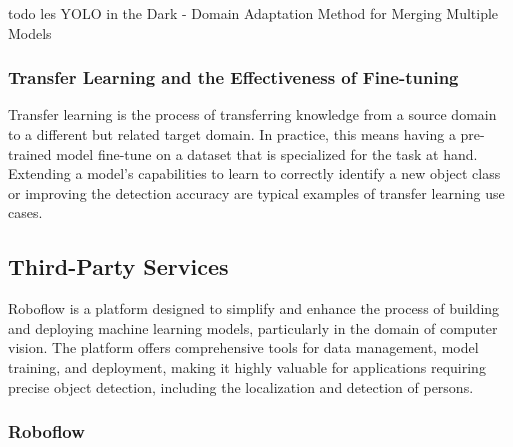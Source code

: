 todo les YOLO in the Dark - Domain Adaptation Method for Merging Multiple Models

\subsubsection{Transfer Learning and the Effectiveness of Fine-tuning}
\label{sec:dataset_specialization}
Transfer learning is the process of transferring knowledge from a source domain to a different but related target domain. In practice, this means having a pre-trained model fine-tune on a dataset that is specialized for the task at hand. Extending a model's capabilities to learn to correctly identify a new object class or improving the detection accuracy are typical examples of transfer learning use cases. 

\subsection{Third-Party Services}
Roboflow is a platform designed to simplify and enhance the process of building and deploying machine learning models, particularly in the domain of computer vision. The platform offers comprehensive tools for data management, model training, and deployment, making it highly valuable for applications requiring precise object detection, including the localization and detection of persons.

\subsubsection{Roboflow}

